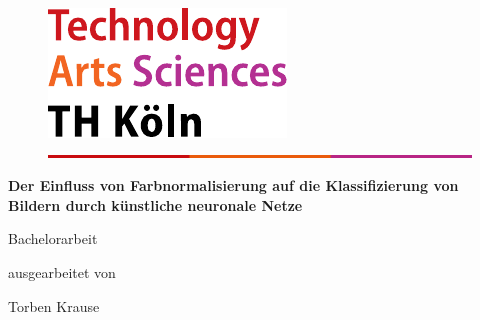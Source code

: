 \begin{titlepage}
\newcommand{\distance}{1.2cm}
\begin{center}
\begin{figure}[!ht]
	\flushright
		\includegraphics[width=.2\textwidth]{images/logo.pdf}
		\includegraphics[width=\textwidth]{images/balken.png}
\end{figure}

\vspace{\distance}

\begin{rmfamily}
\begin{huge}
\textbf{Der Einfluss von Farbnormalisierung auf die Klassifizierung von Bildern durch künstliche neuronale Netze}\\	
\end{huge}

\end{rmfamily}

\vspace{1.0cm}



\begin{LARGE}
\begin{scshape}
Bachelorarbeit\\[0.6em]
\end{scshape}
\end{LARGE}

\begin{large}
ausgearbeitet von\\
\begin{LARGE}
Torben Krause\\
\end{LARGE}
\end{large}


\end{center}
\end{titlepage}
